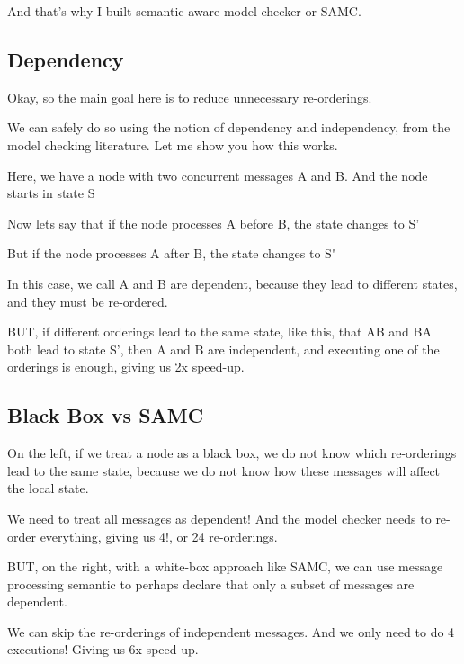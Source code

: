 And that's why I built semantic-aware model checker or SAMC.

\subsection{Dependency}

Okay, so the main goal here is to reduce unnecessary re-orderings.

We can safely do so using the notion of dependency and independency, from the
model checking literature. Let me show you how this works.

Here, we have a node with two concurrent messages A and B. And the node starts
in state S

Now lets say that if the node processes A before B, the state changes to S'

But if the node processes A after B, the state changes to S"

In this case, we call A and B are dependent, because they lead to different
states, and they must be re-ordered.

BUT, if different orderings lead to the same state, like this, that AB and BA
both lead to state S', then A and B are independent, and executing one of the
orderings is enough, giving us 2x speed-up.

\subsection{Black Box vs SAMC}


On the left, if we treat a node as a black box, we do not know which
re-orderings lead to the same state, because we do not know how these messages
will affect the local state. 

We need to treat all messages as dependent! And the model checker needs to
re-order everything, giving us 4!, or 24 re-orderings.

BUT, on the right, with a white-box approach like SAMC, we can use message
processing semantic to perhaps declare that only a subset of messages are
dependent.

We can skip the re-orderings of independent messages. And we only need to do 4
executions! Giving us 6x speed-up.

%
%

